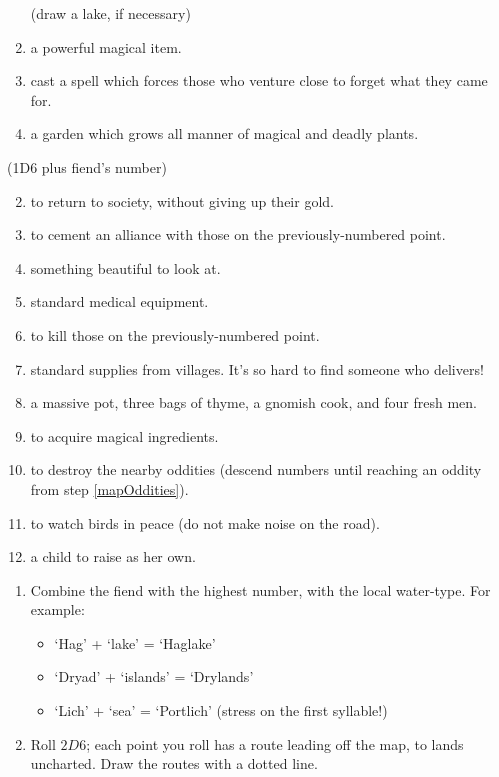 \begin{multicols}{2}
\begin{enumerate}
  (draw a lake, if necessary)
\item
  a powerful magical item.
\item
  cast a spell which forces those who venture close to forget what they
  came for.
\item
  a garden which grows all manner of magical and deadly plants.
\end{enumerate}


(1D6 plus fiend's number)

\begin{enumerate}
\setcounter{enumi}{1}
\item
  to return to society, without giving up their gold.
\item
  to cement an alliance with those on the previously-numbered point.
\item
  something beautiful to look at.
\item
  standard medical equipment.
\item
  to kill those on the previously-numbered point.
\item
  standard supplies from villages. It's so hard to find someone who
  delivers!
\item
  a massive pot, three bags of thyme, a gnomish cook, and four fresh men.
\item
  to acquire magical ingredients.
\item
  to destroy the nearby oddities (descend numbers until reaching an oddity from step \ref{mapOddities}).
\item
  to watch birds in peace (do not make noise on the road).
\item
  a child to raise as her own.
\end{enumerate}


\begin{enumerate}
  \item
  Combine the fiend with the highest number, with the local water-type.
  For example:
  \begin{itemize}
  \item
    `Hag' + `lake' = `Haglake'
  \item
    `Dryad' + `islands' = `Drylands'
  \item
    `Lich' + `sea' = `Portlich' (stress on the first syllable!)
  \end{itemize}

  \item
  Roll $2D6$; each point you roll has a route leading off the map, to lands uncharted.
  Draw the routes with a dotted line.


\end{enumerate}
\end{multicols}
